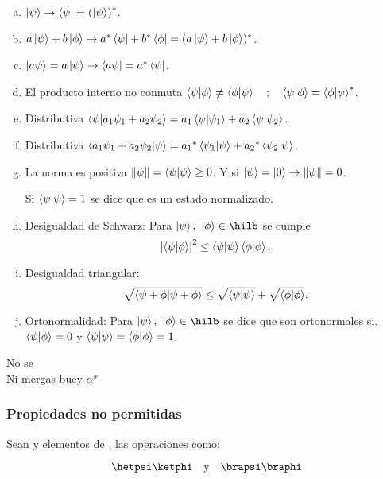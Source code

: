 \begin{enumerate}[a)]
    \item $\ket{\psi}\rightarrow\bra{\psi}=\qty(\ket{\psi})^*$.
    \item $a\ket{\psi}+b\ket{\phi}\rightarrow a^*\bra{\psi}+b^*\bra{\phi}=(a\ket{\psi}+b\ket{\phi})^*$.
    \item $\ket{a\psi}=a\ket{\psi}\rightarrow\bra{a\psi}=a^*\bra{\psi}$.
    \item El producto interno no conmuta  $\braket{\psi}{\phi}\not=\braket{\phi}{\psi}\qq{;}\braket{\psi}{\phi}=\braket{\phi}{\psi}^*$.
    \item Distributiva $\braket{\psi}{a_1\psi_1+a_2\psi_2}=a_1\braket{\psi}{\psi_1}+a_2\braket{\psi}{\psi_2}$.
    \item Distributiva $\braket{a_1\psi_1+a_2\psi_2}{\psi}={a_1}^*\braket{\psi_1}{\psi}+{a_2}^*\braket{\psi_2}{\psi}$.
    
    \item La norma es positiva $\norm{\psi}=\braket{\psi}\geq0$. Y si $\ket{\psi}=\ket{0}\rightarrow\norm{\psi}=0$.
    
    Si $\braket{\psi}=1$ se dice que es un estado normalizado.
    
    \item Desigualdad de Schwarz: Para $\ket{\psi},~\ket{\phi}\in\hilb$ se cumple
    \[ \abs{\braket{\psi}{\phi}}^2\leq\braket{\psi}\braket{\phi}. \]
    \item Desigualdad triangular:
    \[ \sqrt{\braket{\psi+\phi}}\leq\sqrt{\braket{\psi}}+\sqrt{\braket{\phi}}. \]
    \item Ortonormalidad: Para $\ket{\psi},~\ket{\phi}\in\hilb$ se dice que son ortonormales si. $\braket{\psi}{\phi}=0$ y $\braket{\psi}=\braket{\phi}=1$.
    
\end{enumerate}


\begin{example}
No se\\
Ni mergas buey $\alpha^x$
\end{example}

\subsubsection{Propiedades no permitidas}

Sean \ketpsi y \ketphi elementos de \hilb, las operaciones como:

\[
    \hetpsi\ketphi\qq{y}\brapsi\braphi
\]

